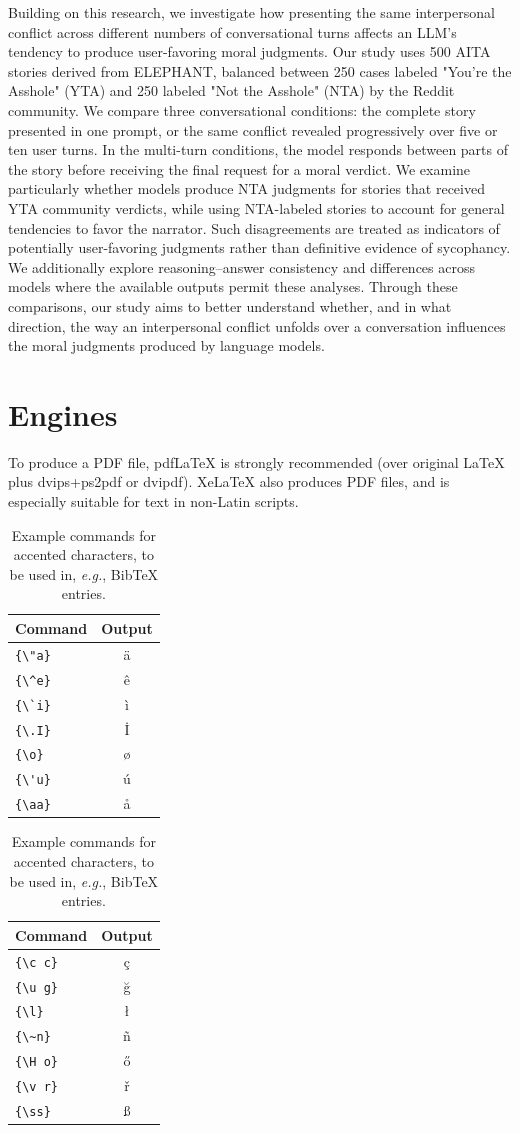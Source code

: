 \documentclass[11pt]{article}
\begin{document}
Building on this research, we investigate how presenting the same interpersonal conflict across different numbers of conversational turns affects an LLM's tendency to produce user-favoring moral judgments. Our study uses 500 AITA stories derived from ELEPHANT, balanced between 250 cases labeled "You're the Asshole" (YTA) and 250 labeled "Not the Asshole" (NTA) by the Reddit community. We compare three conversational conditions: the complete story presented in one prompt, or the same conflict revealed progressively over five or ten user turns. In the multi-turn conditions, the model responds between parts of the story before receiving the final request for a moral verdict. We examine particularly whether models produce NTA judgments for stories that received YTA community verdicts, while using NTA-labeled stories to account for general tendencies to favor the narrator. Such disagreements are treated as indicators of potentially user-favoring judgments rather than definitive evidence of sycophancy. We additionally explore reasoning–answer consistency and differences across models where the available outputs permit these analyses. Through these comparisons, our study aims to better understand whether, and in what direction, the way an interpersonal conflict unfolds over a conversation influences the moral judgments produced by language models.

\section{Engines}

To produce a PDF file, pdf\LaTeX{} is strongly recommended (over original \LaTeX{} plus dvips+ps2pdf or dvipdf). Xe\LaTeX{} also produces PDF files, and is especially suitable for text in non-Latin scripts.
\begin{table}
\centering
\begin{tabular}{lc}
\hline
\textbf{Command} & \textbf{Output}\\
\hline
\verb|{\"a}| & {\"a} \\
\verb|{\^e}| & {\^e} \\
\verb|{\`i}| & {\`i} \\ 
\verb|{\.I}| & {\.I} \\ 
\verb|{\o}| & {\o} \\
\verb|{\'u}| & {\'u}  \\ 
\verb|{\aa}| & {\aa}  \\\hline
\end{tabular}
\begin{tabular}{lc}
\hline
\textbf{Command} & \textbf{Output}\\
\hline
\verb|{\c c}| & {\c c} \\ 
\verb|{\u g}| & {\u g} \\ 
\verb|{\l}| & {\l} \\ 
\verb|{\~n}| & {\~n} \\ 
\verb|{\H o}| & {\H o} \\ 
\verb|{\v r}| & {\v r} \\ 
\verb|{\ss}| & {\ss} \\
\hline
\end{tabular}
\caption{Example commands for accented characters, to be used in, \emph{e.g.}, Bib\TeX{} entries.}
\label{tab:accents}
\end{table}
\end{document}
